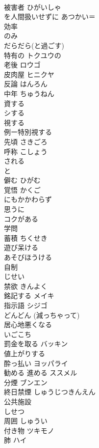 \documentclass[8pt]{extreport}
\begin{document}
\begin{CJK}{UTF8}{min}
\\	被害者	ひがいしゃ 
\\	を人間扱いせずに	あつかい＝
\\	効率	
\\	のみ	
\\	だらだら(と過ごす)	
\\	特有の	トクユウの 
\\	老後	ロウゴ 
\\	皮肉屋	ヒニクヤ 
\\	反論	はんろん 
\\	中年	ちゅうねん 
\\	資する	
\\	シする
\\	視する	
\\	例ー特別視する 
\\	先頃	さきごろ 
\\	呼称	こしょう 
\\	される 
\\	と
\\	僻む	ひがむ 
\\	覚悟	かくご 
\\	にもかかわらず	
\\	思うに	
\\	コクがある	
\\	学問	
\\	蓄積	ちくせき 
\\	遊び呆ける	
\\	あそびほうける
\\	自制	
\\	じせい
\\	禁欲	きんよく 
\\	銘記する	メイキ 
\\	指示語	シジゴ 
\\	どんどん (減っちゃって)	
\\	居心地悪くなる	
\\	いごこち
\\	罰金を取る	バッキン 
\\	値上がりする	
\\	酔っ払い	ヨッパライ 
\\	勧める	進める ススメル
\\	分煙	ブンエン 
\\	終日禁煙	しゅうじつきんえん 
\\	公共施設	
\\	しせつ
\\	周囲	しゅうい 
\\	付き物	ツキモノ 
\\	肺	ハイ 

\end{CJK}
\end{document}
